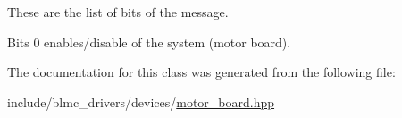 These are the list of bits of the message. 

Bits 0 enables/disable of the system (motor board). 

The documentation for this class was generated from the following file\+:\begin{DoxyCompactItemize}
\item 
include/blmc\+\_\+drivers/devices/\hyperlink{motor__board_8hpp}{motor\+\_\+board.\+hpp}\end{DoxyCompactItemize}
